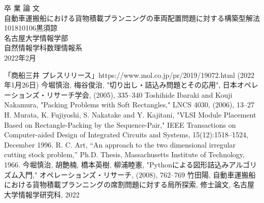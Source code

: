 \documentclass[platex]{jreport}
\begin{document}
\begin{table}[b]
\begin{center}
{\huge 卒\hspace{0.1cm} 業\hspace{0.1cm} 論\hspace{0.1cm} 文}\\[2.5cm]
{\huge 自動車運搬船における貨物積載プランニングの車両配置問題に対する構築型解法}\\[6cm]
{\huge 101810106\qquad 黒須諒}\\[1cm]
{\huge 名古屋大学情報学部}\\[0.5cm]
{\huge 自然情報学科数理情報系}\\[0.5cm]
{\huge 2022年2月}\\
\end{center}
\end{table} 


\thispagestyle{empty} 
\clearpage
\newpage
{}
\setcounter{page}{1}



% 



\thispagestyle{empty} 
\tableofcontents
\newpage
\setcounter{page}{1}
\pagestyle{plain}







% 







\begin{thebibliography}{99}
	「商船三井 プレスリリース」https://www.mol.co.jp/pr/2019/19072.html (2022年1月26日)
	今堀慎治, 梅谷俊治, "切り出し・詰込み問題とその応用", 日本オペレーションズ・リサーチ学会, (2005), 335--340
	Toshihide Ibaraki and Kouji Nakamura, "Packing Problems with Soft Rectangles," LNCS 4030, (2006), 13--27
	H. Murata, K. Fujiyoshi, S. Nakatake and Y. Kajitani, "VLSI Module Placement Based on Rectangle-Packing by the Sequence-Pair," 
	IEEE Transactions on Computer-aided Design of Integrated Circuits and Systems, 15(12):1518--1524, December 1996.
	R. C. Art, “An approach to the two dimensional irregular cutting stock problem,” 
	Ph.D. Thesis, Massachusetts Institute of Technology, 1966.
	今堀慎治, 胡艶楠, 橋本英樹, 柳浦睦憲, "Pythonによる図形詰込みアルゴリズム入門," 
	オペレーションズ・リサーチ, (2008), 762--769
	竹田陽, 自動車運搬船における貨物積載プランニングの席割問題に対する局所探索, 修士論文, 名古屋大学情報学研究科, 2022

\end{thebibliography}
\end{document}
